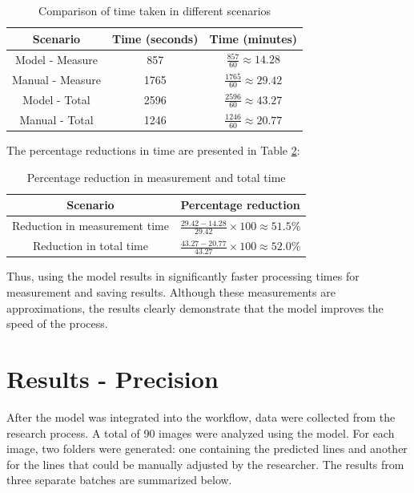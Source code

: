 \begin{table}[H]
    \centering
    \renewcommand{\arraystretch}{1}
    \begin{tabular}{|c|c|c|}
        \hline
        \textbf{Scenario} & \textbf{Time (seconds)} & \textbf{Time (minutes)} \\
        \hline
        Model - Measure & 857 & $\frac{857}{60} \approx 14.28$ \\
        \hline
        Manual - Measure & 1765 & $\frac{1765}{60} \approx 29.42$ \\
        \hline
        Model - Total & 2596 & $\frac{2596}{60} \approx 43.27$ \\
        \hline
        Manual - Total & 1246 & $\frac{1246}{60} \approx 20.77$ \\
        \hline
    \end{tabular}
    \caption{Comparison of time taken in different scenarios}
    \label{tab:time_comparison}
\end{table}

The percentage reductions in time are presented in Table \ref{tab:percentage_reduction}:

\begin{table}[H]
    \centering
    \renewcommand{\arraystretch}{1}
    \begin{tabular}{|c|c|}
        \hline
        \textbf{Scenario} & \textbf{Percentage reduction} \\
        \hline
        Reduction in measurement time & $\frac{29.42 - 14.28}{29.42} \times 100 \approx 51.5\%$ \\
        \hline
        Reduction in total time & $\frac{43.27 - 20.77}{43.27} \times 100 \approx 52.0\%$ \\
        \hline
    \end{tabular}
    \caption{Percentage reduction in measurement and total time}
    \label{tab:percentage_reduction}
\end{table}

Thus, using the model results in significantly faster processing times for measurement and saving results. Although these measurements are approximations, the results clearly demonstrate that the model improves the speed of the process.

\section{Results - Precision}

After the model was integrated into the workflow, data were collected from the research process. A total of 90 images were analyzed using the model. For each image, two folders were generated: one containing the predicted lines and another for the lines that could be manually adjusted by the researcher. The results from three separate batches are summarized below.

